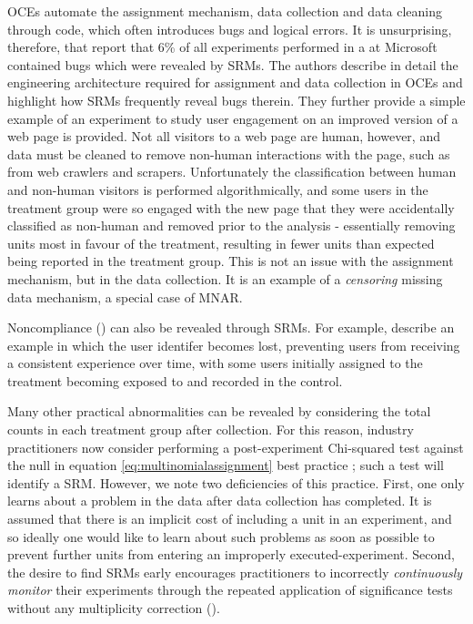 \documentclass[11pt]{article}
\begin{document}
OCEs automate the assignment mechanism, data collection and data cleaning through code, which often introduces bugs and logical errors.
It is unsurprising, therefore, that \cite{fabijan} report that 6\% of all experiments performed in a at Microsoft contained bugs which were revealed by SRMs.
The authors describe in detail the engineering architecture required for assignment and data collection in OCEs and highlight how SRMs frequently reveal bugs therein.
They further provide a simple example of an experiment to study user engagement on an improved version of a web page is provided.
Not all visitors to a web page are human, however, and data must be cleaned to remove non-human interactions with the page, such as from web crawlers and scrapers.
Unfortunately the classification between human and non-human visitors is performed algorithmically, and some users in the treatment group were so engaged with the new page that they were accidentally classified as non-human and removed prior to the analysis - essentially removing units most in favour of the treatment, resulting in fewer units than expected being reported in the treatment group.
This is not an issue with the assignment mechanism, but in the data collection.
It is an example of a \textit{censoring} missing data mechanism, a special case of MNAR.

Noncompliance (\cite{imbens}) can also be revealed through SRMs. For example, \cite{zhao} describe an example in which the user identifer becomes lost, preventing users from receiving a consistent experience over time, with some users initially assigned to the treatment becoming exposed to and recorded in the control.


Many other practical abnormalities can be revealed by considering the total counts in each treatment group after collection.
For this reason, industry practitioners now consider performing a post-experiment Chi-squared test against the null in equation \eqref{eq:multinomialassignment} best practice \citep{linkedin}; such a test will identify a SRM.
However, we note two deficiencies of this practice.
First, one only learns about a problem in the data after data collection has completed.
It is assumed that there is an implicit cost of including a unit in an experiment, and so ideally one would like to learn about such problems as soon as possible to prevent further units from entering an improperly executed-experiment.
Second, the desire to find SRMs early encourages practitioners to incorrectly \textit{continuously monitor} their experiments through the repeated application of significance tests without any multiplicity correction (\cite{armitage}).
\end{document}
